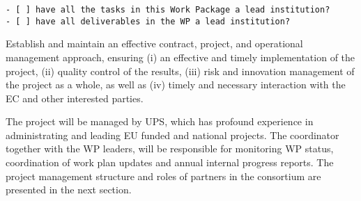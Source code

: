 \begin{draft}
\begin{verbatim}
- [ ] have all the tasks in this Work Package a lead institution?
- [ ] have all deliverables in the WP a lead institution?
\end{verbatim}
\end{draft}



\begin{workpackage}[id=management,type=MGT,wphases=0-48!.2,swsites,
  title=Project Management,short=Management,
  lead=PS,
  PSRM=28,SARM=2,  
  USORM=2,LLRM=2,UVRM=2,UJFRM=2,UBRM=2,UORM=2, USHRM=2, USORM=2,
  UWRM=2, JURM=2, UKRM=2, USRM=2, ZHRM=2, SRRM=2, UWSRM=2]

\begin{wpobjectives}

Establish and maintain an effective contract, project, and operational management
approach, ensuring (i) an effective and timely implementation of the project, (ii) quality control
of the results, (iii) risk and innovation management of the project as a whole, as well as (iv)
timely and necessary interaction with the EC and other interested parties.

\end{wpobjectives}

\begin{wpdescription}
The project will be managed by UPS, which has profound experience in administrating and leading EU funded and national projects. The coordinator together with the WP leaders, will be responsible for monitoring WP status, coordination of work plan updates and annual internal progress reports. The project management structure  and roles of partners in the consortium are presented in the next section.
\end{wpdescription}


\end{workpackage}
